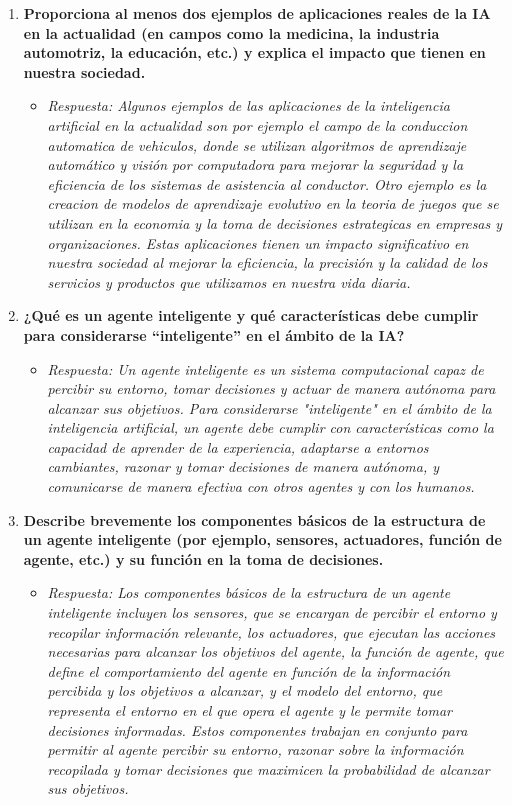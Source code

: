 \documentclass[12pt]{article}
\begin{document}
\begin{enumerate}
    \item \textbf{Proporciona al menos dos ejemplos de aplicaciones reales de la IA en la actualidad (en campos como la medicina, la industria automotriz, la educación, etc.) y explica el impacto que tienen en nuestra sociedad.}
    \begin{itemize}
        \item \textit{Respuesta: Algunos ejemplos de las aplicaciones de la inteligencia artificial en la actualidad son por ejemplo el campo de la conduccion automatica de vehiculos, donde se utilizan algoritmos de aprendizaje automático y visión por computadora para mejorar la seguridad y la eficiencia de los sistemas de asistencia al conductor. Otro ejemplo es la creacion de modelos de aprendizaje evolutivo en la teoria de juegos que se utilizan en la economia y la toma de decisiones estrategicas en empresas y organizaciones. Estas aplicaciones tienen un impacto significativo en nuestra sociedad al mejorar la eficiencia, la precisión y la calidad de los servicios y productos que utilizamos en nuestra vida diaria.} 
    \end{itemize}

    \item \textbf{¿Qué es un agente inteligente y qué características debe cumplir para considerarse “inteligente” en el ámbito de la IA?}
    \begin{itemize}
        \item \textit{Respuesta: Un agente inteligente es un sistema computacional capaz de percibir su entorno, tomar decisiones y actuar de manera autónoma para alcanzar sus objetivos. Para considerarse "inteligente" en el ámbito de la inteligencia artificial, un agente debe cumplir con características como la capacidad de aprender de la experiencia, adaptarse a entornos cambiantes, razonar y tomar decisiones de manera autónoma, y comunicarse de manera efectiva con otros agentes y con los humanos.} 
    \end{itemize}

    \item \textbf{Describe brevemente los componentes básicos de la estructura de un agente inteligente (por ejemplo, sensores, actuadores, función de agente, etc.) y su función en la toma de decisiones.}
    \begin{itemize}
        \item \textit{Respuesta: Los componentes básicos de la estructura de un agente inteligente incluyen los sensores, que se encargan de percibir el entorno y recopilar información relevante, los actuadores, que ejecutan las acciones necesarias para alcanzar los objetivos del agente, la función de agente, que define el comportamiento del agente en función de la información percibida y los objetivos a alcanzar, y el modelo del entorno, que representa el entorno en el que opera el agente y le permite tomar decisiones informadas. Estos componentes trabajan en conjunto para permitir al agente percibir su entorno, razonar sobre la información recopilada y tomar decisiones que maximicen la probabilidad de alcanzar sus objetivos.} 
    \end{itemize}


\end{enumerate}
\end{document}
